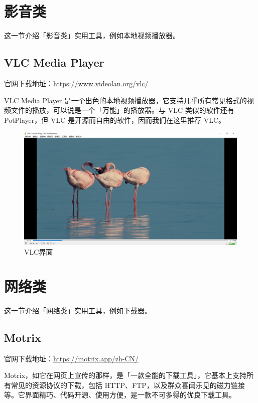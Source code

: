 \section{影音类}

这一节介绍「影音类」实用工具，例如本地视频播放器。

\subsection{VLC Media Player}

官网下载地址：\url{https://www.videolan.org/vlc/}

VLC Media Player 是一个出色的本地视频播放器，它支持几乎所有常见格式的视频文件的播放，可以说是一个「万能」的播放器。与 VLC 类似的软件还有 PotPlayer，但 VLC 是开源而自由的软件，因而我们在这里推荐 VLC。

\begin{figure}[htb!]
  \centering
  \includegraphics[width=13cm]{assets/VLC.jpg}
  \caption[VLC界面]{VLC界面\footnotemark}
  \label{VLC}
\end{figure}


\section{网络类}

这一节介绍「网络类」实用工具，例如下载器。

\subsection{Motrix}

官网下载地址：\url{https://motrix.app/zh-CN/}

Motrix，如它在网页上宣传的那样，是「一款全能的下载工具」，它基本上支持所有常见的资源协议的下载，包括 HTTP、FTP，以及群众喜闻乐见的磁力链接等。它界面精巧、代码开源、使用方便，是一款不可多得的优良下载工具。

